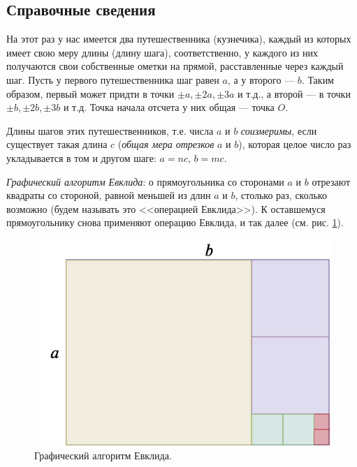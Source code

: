 \subsection*{Справочные сведения}

На этот раз у нас имеется два путешественника (кузнечика), каждый из которых имеет свою меру длины (длину шага), соответственно, у каждого из них получаются свои собственные ометки на прямой, расставленные через каждый шаг. Пусть у первого путешественника шаг равен $a$, а у второго --- $b$. Таким образом, первый может придти в точки $\pm a, \pm 2a, \pm 3a$ и т.д., а второй --- в точки $\pm b, \pm 2b, \pm 3b$ и т.д. Точка начала отсчета у них общая --- точка $O$. 

Длины шагов этих путешественников, т.е. числа $a$ и $b$ \textit{соизмеримы}, если существует такая длина $c$ (\textit{общая мера отрезков} $a$ и $b$), которая целое число раз укладывается в том и другом шаге: $a=nc$, $b=mc$. 

\textit{Графический алгоритм Евклида}: о прямоугольника со сторонами $a$ и $b$ отрезают квадраты со стороной, равной меньшей из длин $a$ и $b$, столько раз, сколько возможно (будем называть это <<операцией Евклида>>). К оставшемуся прямоугольнику снова применяют операцию Евклида, и так далее (см. рис. \ref{soizmer}).
\begin{figure}[hbt!]
\begin{center}
\includegraphics[scale=0.3]{../soizmer.png}
\end{center}
\caption{Графический алгоритм Евклида.}\label{soizmer}
\end{figure}

